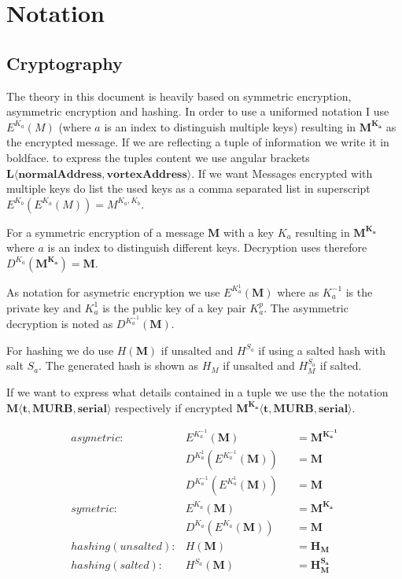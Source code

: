 \section{Notation}
\subsection{Cryptography}
The theory in this document is heavily based on symmetric encryption, asymmetric encryption and hashing. In order to use a uniformed notation I use $E^{K_a}(M)$ (where $a$ is an index to distinguish multiple keys) resulting in $\mathbf{M^{K_a}}$ as the encrypted message. If we are reflecting a tuple of information we write it in boldface. to express the tuples content we use angular brackets $\mathbf{L\langle normalAddress,vortexAddress\rangle }$. If we want Messages encrypted with multiple keys do list the used keys as a comma separated list in superscript $E^{K_b}\left(E^{K_a}\left(M\right)\right)=M^{{K_{a}},{K_b}}$.

For a symmetric encryption of a message $\mathbf{M}$ with a key $K_a$ resulting in $\mathbf{M^{K_a}}$ where $a$ is an index to distinguish different keys. Decryption uses therefore $D^{K_a}(\mathbf{M^{K_a}})=\mathbf{M}$.

As notation for asymetric encryption we use $E^{K^{1}_a}(\mathbf{M})$ where as $K^{-1}_a$ is the private key and $K^{1}_a$ is the public key of a key pair $K^p_a$. The asymmetric decryption is noted as $D^{K^{-1}_a}(\mathbf{M})$.

For hashing we do use $H(\mathbf{M})$ if unsalted and $H^{S_a}$ if using a salted hash with salt $S_a$. The generated hash is shown as $H_M$ if unsalted and $H^{S_a}_M$ if salted.

If we want to express what details contained in a tuple we use the the notation $\mathbf{M\langle t,MURB,serial\rangle }$ respectively if encrypted $\mathbf{M^{K_{a}}\langle t,MURB,serial\rangle}$.

\begin{align*}
asymetric:         & E^{K^{-1}_a}\left(\mathbf{M}\right)                        	&& =\mathbf{M^{K^{-1}_a}}\\
                   & D^{K^{1}_a}\left(E^{K^{-1}_a}\left(\mathbf{M}\right)\right)	&& =\mathbf{M}\\
                   & D^{K^{-1}_a}\left(E^{K^{1}_a}\left(\mathbf{M}\right)\right)	&& =\mathbf{M}\\
symetric:          & E^{K_a}\left(\mathbf{M}\right)                             	&& =\mathbf{M^{K_a}}\\
                   & D^{K_a}\left(E^{K_a}\left(\mathbf{M}\right)\right)         	&& =\mathbf{M}\\
hashing (unsalted):& H\left(\mathbf{M}\right)                                   	&& =\mathbf{H_M}\\
hashing (salted):  & H^{S_a}\left(\mathbf{M}\right)                             	&& =\mathbf{H^{S_a}_M}
\end{align*}

